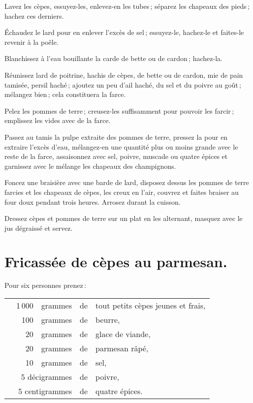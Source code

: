 Lavez les cèpes, essuyez-les, enlevez-en les tubes ; séparez les chapeaux des
pieds ; hachez ces derniers.

Échaudez le lard pour en enlever l'excès de sel ; essuyez-le, hachez-le et faites-le
revenir à la poêle.

Blanchissez à l'eau bouillante la carde de bette ou de cardon ; hachez-la.

Réunissez lard de poitrine, hachis de cèpes, de bette ou de cardon, mie de pain
tamisée, persil haché ; ajoutez un peu d'ail haché, du sel et du poivre au
goût ; mélangez bien ; cela constituera la farce.

Pelez les pommes de terre ; creusez-les suffisamment pour pouvoir les farcir ;
emplissez les vides avec de la farce.

Passez au tamis la pulpe extraite des pommes de terre, pressez la pour en
extraire l'excès d'eau, mélangez-en une quantité plus ou moins grande avec le
reste de la farce, assaisonnez avec sel, poivre, muscade ou quatre épices et
garnissez avec le mélange les chapeaux des champignons.

Foncez une braisière avec une barde de lard, disposez dessus les pommes de
terre farcies et les chapeaux de cèpes, les creux en l'air, couvrez et faites braiser
au four doux pendant trois heures. Arrosez durant la cuisson.

Dressez cèpes et pommes de terre sur un plat en les alternant, masquez avec le
jus dégraissé et servez.

\section*{\centering Fricassée de cèpes au parmesan.}
{}

Pour six personnes prenez :

\footnotesize
\begin{longtable}{rrrrp{16em}}
  &   1 000 & grammes & de & tout petits cèpes jeunes et frais,                                           \\
  &     100 & grammes & de & beurre,                                                                      \\
  &      20 & grammes & de & glace de viande,                                                             \\
  &      20 & grammes & de & parmesan râpé,                                                               \\
  &      10 & grammes & de & sel,                                                                         \\
  & \multicolumn{2}{r}{5 décigrammes}  & de & poivre,                                                     \\
  & \multicolumn{2}{r}{5 centigrammes} & de & quatre épices.                                              \\
\end{longtable}
\normalsize

